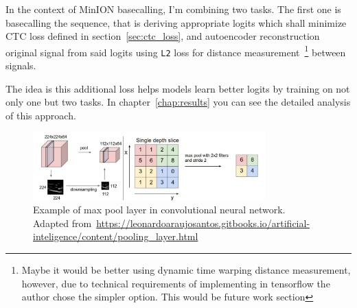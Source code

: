 \documentclass[times, utf8, diplomski, english]{fer}
\begin{document}
In the context of MinION basecalling, I'm combining two tasks. 
The first one is basecalling the sequence, that is deriving appropriate logits which shall minimize CTC loss defined in section~\ref{sec:ctc_loss}, and autoencoder reconstruction original signal from said logits using \texttt{L2} loss for distance measurement~\footnote{Maybe it would be better using dynamic time warping distance measurement, however, due to technical requirements of implementing in tensorflow the author chose the simpler option. This would be future work section} between signals. 

The idea is this additional loss helps models learn better logits by training on not only one but two tasks. In chapter~\ref{chap:results} you can see the detailed analysis of this approach.

\begin{figure}[!ht]
    \begin{center}
        \includegraphics[width=0.8\textwidth]{Pooling_Simple_max}
        \caption{Example of max pool layer in convolutional neural network. Adapted from~\url{https://leonardoaraujosantos.gitbooks.io/artificial-inteligence/content/pooling_layer.html}}
        \label{fg:maxpool}
    \end{center}
\end{figure}

\end{document}
